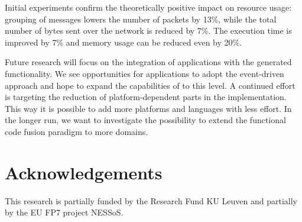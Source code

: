 \documentclass[3p,times,procedia]{elsarticle}
\begin{document}
Initial experiments confirm the theoretically positive impact on resource
usage: grouping of messages lowers the number of packets by 13\%, while the
total number of bytes sent over the network is reduced by 7\%. The execution
time is improved by 7\% and memory usage can be reduced even by 20\%.

Future research will focus on the integration of applications with the
generated functionality. We see opportunities for applications to adopt the
event-driven approach and hope to expand the capabilities of \FOO to this
level. A continued effort is targeting the reduction of platform-dependent
parts in the implementation. This way it is possible to add more platforms and
languages with less effort. In the longer run, we want to investigate the
possibility to extend the functional code fusion paradigm to more domains.

\section{Acknowledgements}

This research is partially funded by the Research Fund KU Leuven and partially
by the EU FP7 project NESSoS\@.



\end{document}

